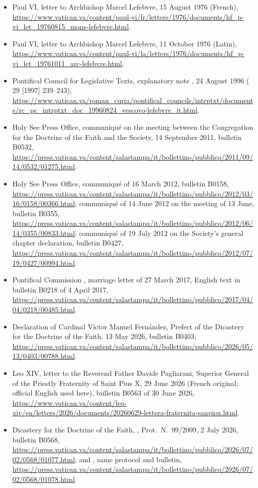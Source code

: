 \begin{itemize}
\item Paul VI, letter to Archbishop Marcel Lefebvre, 15 August 1976
(French),
\url{https://www.vatican.va/content/paul-vi/fr/letters/1976/documents/hf_p-vi_let_19760815_mons-lefebvre.html}.
\item Paul VI, letter to Archbishop Marcel Lefebvre, 11 October 1976
(Latin),
\url{https://www.vatican.va/content/paul-vi/la/letters/1976/documents/hf_p-vi_let_19761011_arc-lefebvre.html}.
\item Pontifical Council for Legislative Texts, explanatory note
, 24 August 1996
( 29 [1997] 239--243),
\url{https://www.vatican.va/roman_curia/pontifical_councils/intrptxt/documents/rc_pc_intrptxt_doc_19960824_vescovo-lefebvre_it.html}.
\item Holy See Press Office, communiqué on the meeting between the
Congregation for the Doctrine of the Faith and the Society, 14 September
2011, bulletin B0532,
\url{https://press.vatican.va/content/salastampa/it/bollettino/pubblico/2011/09/14/0532/01275.html}.
\item Holy See Press Office, communiqué of 16 March 2012, bulletin B0158,
\url{https://press.vatican.va/content/salastampa/it/bollettino/pubblico/2012/03/16/0158/00366.html};
communiqué of 14 June 2012 on the meeting of 13 June, bulletin B0355,
\url{https://press.vatican.va/content/salastampa/it/bollettino/pubblico/2012/06/14/0355/00833.html};
communiqué of 19 July 2012 on the Society's general chapter declaration,
bulletin B0427,
\url{https://press.vatican.va/content/salastampa/it/bollettino/pubblico/2012/07/19/0427/00994.html}.
\item Pontifical Commission , marriage letter of
27 March 2017, English text in bulletin B0218 of 4 April 2017,
\url{https://press.vatican.va/content/salastampa/it/bollettino/pubblico/2017/04/04/0218/00485.html}.
\item Declaration of Cardinal Víctor Manuel Fernández, Prefect of the
Dicastery for the Doctrine of the Faith, 13 May 2026, bulletin B0403,
\url{https://press.vatican.va/content/salastampa/it/bollettino/pubblico/2026/05/13/0403/00788.html}.
\item Leo XIV, letter to the Reverend Father Davide Pagliarani, Superior
General of the Priestly Fraternity of Saint Pius X, 29 June 2026 (French
original; official English used here), bulletin B0563 of 30 June 2026,
\url{https://www.vatican.va/content/leo-xiv/en/letters/2026/documents/20260629-lettera-fraternita-sanpiox.html}.
\item Dicastery for the Doctrine of the Faith, , Prot.\
N.~99/2009, 2 July 2026, bulletin B0568,
\url{https://press.vatican.va/content/salastampa/it/bollettino/pubblico/2026/07/02/0568/01077.html};
and \work{Nota Esplicativa}, same protocol and bulletin,
\url{https://press.vatican.va/content/salastampa/it/bollettino/pubblico/2026/07/02/0568/01078.html}.
\end{itemize}

